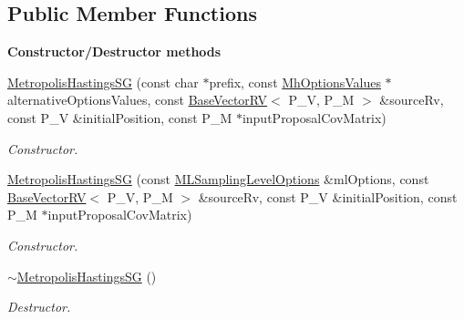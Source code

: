 \subsection*{Public Member Functions}
\begin{Indent}{\bf Constructor/\-Destructor methods}\par
\begin{DoxyCompactItemize}
\item 
\hyperlink{class_q_u_e_s_o_1_1_metropolis_hastings_s_g_aced8a6afa8902ab317f67b5ab38492b3}{Metropolis\-Hastings\-S\-G} (const char $\ast$prefix, const \hyperlink{class_q_u_e_s_o_1_1_mh_options_values}{Mh\-Options\-Values} $\ast$alternative\-Options\-Values, const \hyperlink{class_q_u_e_s_o_1_1_base_vector_r_v}{Base\-Vector\-R\-V}$<$ P\-\_\-\-V, P\-\_\-\-M $>$ \&source\-Rv, const P\-\_\-\-V \&initial\-Position, const P\-\_\-\-M $\ast$input\-Proposal\-Cov\-Matrix)
\begin{DoxyCompactList}\small\item\em Constructor. \end{DoxyCompactList}\item 
\hyperlink{class_q_u_e_s_o_1_1_metropolis_hastings_s_g_a76aacd5c5b50134dc97b0bb8a8d3c047}{Metropolis\-Hastings\-S\-G} (const \hyperlink{class_q_u_e_s_o_1_1_m_l_sampling_level_options}{M\-L\-Sampling\-Level\-Options} \&ml\-Options, const \hyperlink{class_q_u_e_s_o_1_1_base_vector_r_v}{Base\-Vector\-R\-V}$<$ P\-\_\-\-V, P\-\_\-\-M $>$ \&source\-Rv, const P\-\_\-\-V \&initial\-Position, const P\-\_\-\-M $\ast$input\-Proposal\-Cov\-Matrix)
\begin{DoxyCompactList}\small\item\em Constructor. \end{DoxyCompactList}\item 
\hyperlink{class_q_u_e_s_o_1_1_metropolis_hastings_s_g_a86d5903964a3c8a873ab119be1b030a9}{$\sim$\-Metropolis\-Hastings\-S\-G} ()
\begin{DoxyCompactList}\small\item\em Destructor. \end{DoxyCompactList}\end{DoxyCompactItemize}
\end{Indent}

